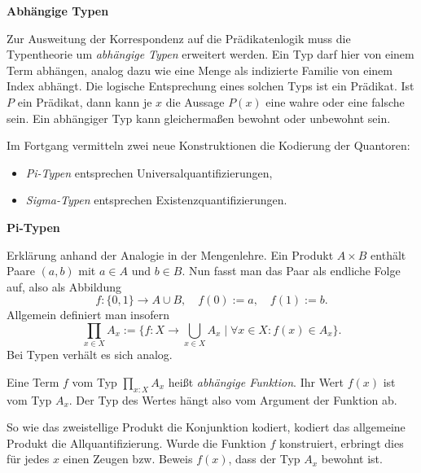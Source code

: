 \documentclass[8pt]{beamer}
\newcommand{\strong}[1]{\textsf{\textbf{#1}}}
\newcommand{\centerheadline}[1]{%
  \begin{center}\strong{#1}\end{center}}
\newcommand{\parspace}{\vspace{0.8em}}
\begin{document}
\begin{frame}
\centerheadline{Abhängige Typen}
\end{frame}

\begin{frame}
Zur Ausweitung der Korrespondenz auf die Prädikatenlogik
muss die Typentheorie um \emph{abhängige Typen} erweitert werden.
Ein Typ darf hier von einem Term abhängen, analog dazu wie eine
Menge als indizierte Familie von einem Index abhängt. Die logische
Entsprechung eines solchen Typs ist ein Prädikat. Ist $P$ ein
Prädikat, dann kann je $x$ die Aussage $P(x)$ eine wahre oder
eine falsche sein. Ein abhängiger Typ kann gleichermaßen bewohnt oder
unbewohnt sein.

\parspace
Im Fortgang vermitteln zwei neue Konstruktionen
die Kodierung der Quantoren:
\begin{itemize}
\item \emph{Pi-Typen} entsprechen Universalquantifizierungen,
\item \emph{Sigma-Typen} entsprechen Existenzquantifizierungen.
\end{itemize}
\end{frame}

\begin{frame}[t]
\strong{Pi-Typen}

\vspace{3em}
Erklärung anhand der Analogie in der Mengenlehre. Ein Produkt $A\times B$
enthält Paare $(a,b)$ mit $a\in A$ und $b\in B$. Nun fasst man das
Paar als endliche Folge auf, also als Abbildung
\[f\colon\{0,1\}\to A\cup B, \quad f(0):=a,\quad f(1):=b.\]\pause
Allgemein definiert man insofern
\[\prod_{x\in X} A_x := \{f\colon X\to\bigcup_{x\in X}A_x\mid\forall x\in X\colon f(x)\in A_x\}.\]\pause
Bei Typen verhält es sich analog.

\parspace
Eine Term $f$ vom Typ $\prod_{x\colon X} A_x$ heißt \emph{abhängige Funktion}.
Ihr Wert $f(x)$ ist vom Typ $A_x$. Der Typ des Wertes hängt also vom Argument
der Funktion ab.\pause

\parspace
So wie das zweistellige Produkt die Konjunktion kodiert, kodiert
das allgemeine Produkt die Allquantifizierung. Wurde die Funktion $f$
konstruiert, erbringt dies für jedes $x$ einen Zeugen bzw. Beweis $f(x)$,
dass der Typ $A_x$ bewohnt ist.
\end{frame}
\end{document}
